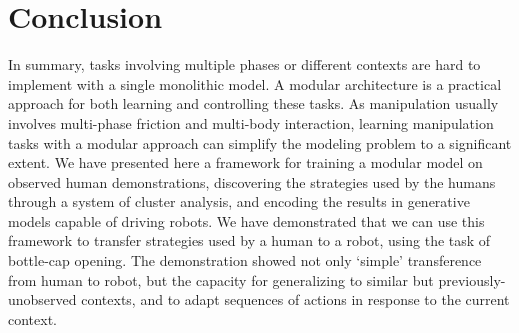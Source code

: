 \section{Conclusion}
\label{sec:conclusion}
In summary, tasks involving multiple phases or different contexts are
hard to implement with a single monolithic model. A modular architecture is a
practical approach for both learning and controlling these tasks. As
manipulation usually involves multi-phase friction and multi-body
interaction, learning manipulation tasks with a modular approach can
simplify the modeling problem to a significant extent. We have
presented here a framework for training a modular model on observed
human demonstrations, discovering the strategies used by the humans
through a system of cluster analysis, and encoding
the results in generative models capable of driving robots. We have
demonstrated that we can use this framework to transfer strategies
used by a human to a robot, using the task of bottle-cap
opening. The demonstration showed not only `simple' transference from
human to robot, but the capacity for generalizing to similar but
previously-unobserved contexts, and to adapt sequences of actions in
response to the current context.




